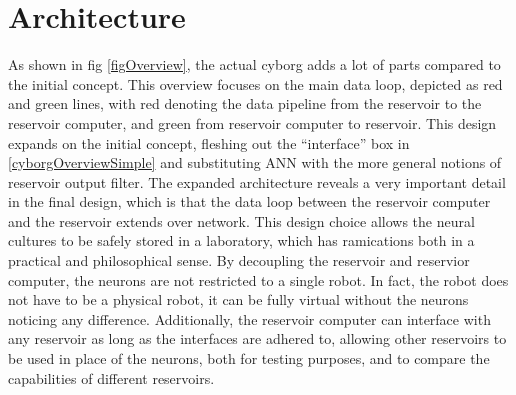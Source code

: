 \section{Architecture}
As shown in fig \ref{figOverview}, the actual cyborg adds a lot of parts
compared to the initial concept.
This overview focuses on the main data loop, depicted as red and green lines,
with red denoting the data pipeline from the reservoir to the reservoir
computer, and green from reservoir computer to reservoir.
This design expands on the initial concept, fleshing out the ``interface'' box
in \ref{cyborgOverviewSimple} and substituting ANN with the more
general notions of reservoir output filter.
The expanded architecture reveals a very important detail in the final design,
which is that the data loop between the reservoir computer and the reservoir
extends over network.
This design choice allows the neural cultures to be safely stored in a
laboratory, which has ramications both in a practical and philosophical sense.
By decoupling the reservoir and reservior computer, the neurons are not
restricted to a single robot.
In fact, the robot does not have to be a physical robot, it can be fully virtual
without the neurons noticing any difference.
Additionally, the reservoir computer can interface with any reservoir as long as
the interfaces are adhered to, allowing other reservoirs to be used in place of
the neurons, both for testing purposes, and to compare the capabilities of
different reservoirs.
